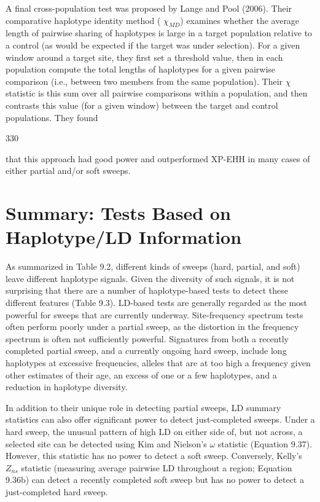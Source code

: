 \documentclass{article}
\begin{document}
A final cross-population test was proposed by Lange and Pool (2006). Their comparative haplotype identity method ( $ \chi_{MD} $) examines whether the average length of pairwise sharing of haplotypes is large in a target population relative to a control (as would be expected if the target was under selection). For a given window around a target site, they first set a threshold value, then in each population compute the total lengths of haplotypes for a given pairwise comparison (i.e., between two members from the same population). Their  $ \chi $ statistic is this sum over all pairwise comparisons within a population, and then contrasts this value (for a given window) between the target and control populations. They found

330

that this approach had good power and outperformed XP-EHH in many cases of either partial and/or soft sweeps.

\section{Summary: Tests Based on Haplotype/LD Information}
As summarized in Table 9.2, different kinds of sweeps (hard, partial, and soft) leave different haplotype signals. Given the diversity of such signals, it is not surprising that there are a number of haplotype-based tests to detect these different features (Table 9.3). LD-based tests are generally regarded as the most powerful for sweeps that are currently underway. Site-frequency spectrum tests often perform poorly under a partial sweep, as the distortion in the frequency spectrum is often not sufficiently powerful. Signatures from both a recently completed partial sweep, and a currently ongoing hard sweep, include long haplotypes at excessive frequencies, alleles that are at too high a frequency given other estimates of their age, an excess of one or a few haplotypes, and a reduction in haplotype diversity.

In addition to their unique role in detecting partial sweeps, LD summary statistics can also offer significant power to detect just-completed sweeps. Under a hard sweep, the unusual pattern of high LD on either side of, but not across, a selected site can be detected using Kim and Nielson's  $ \omega $ statistic (Equation 9.37). However, this statistic has no power to detect a soft sweep. Conversely, Kelly's  $ Z_{ns} $ statistic (measuring average pairwise LD throughout a region; Equation 9.36b) can detect a recently completed soft sweep but has no power to detect a just-completed hard sweep.
\end{document}
